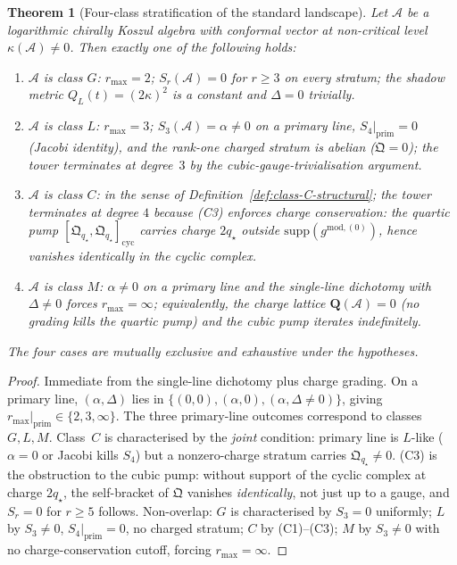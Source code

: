 \documentclass[11pt]{article}
\newtheorem{theorem}{Theorem}[section]
\theoremstyle{definition}
\theoremstyle{remark}
\newcommand{\cA}{\mathcal{A}}
\numberwithin{equation}{section}
\begin{document}
\begin{theorem}[Four-class stratification of the standard landscape]
\label{thm:four-class-stratification}
Let $\cA$ be a logarithmic chirally Koszul algebra with conformal
vector at non-critical level $\kappa(\cA) \neq 0$. Then exactly one
of the following holds:
\begin{enumerate}[nosep,label=(\roman*)]
\item $\cA$ is class $G$: $r_{\max} = 2$; $S_r(\cA) = 0$ for $r \geq 3$
on every stratum; the shadow metric $Q_L(t) = (2\kappa)^2$ is a
constant and $\Delta = 0$ trivially.
\item $\cA$ is class $L$: $r_{\max} = 3$; $S_3(\cA) = \alpha \neq 0$
on a primary line, $S_4|_{\mathrm{prim}} = 0$ (Jacobi identity),
and the rank-one charged stratum is abelian
($\mathfrak{Q} = 0$); the tower terminates at degree~$3$ by the
cubic-gauge-trivialisation argument.
\item $\cA$ is class $C$: in the sense of
Definition~\textup{\ref{def:class-C-structural}}; the tower
terminates at degree $4$ because (C3) enforces charge
conservation: the quartic pump $[\mathfrak{Q}_{q_\star},
\mathfrak{Q}_{q_\star}]_{\mathrm{cyc}}$ carries charge
$2q_\star$ outside $\mathrm{supp}(g^{\mathrm{mod},(0)})$, hence
vanishes identically in the cyclic complex.
\item $\cA$ is class $M$: $\alpha \neq 0$ on a primary line and the
single-line dichotomy with $\Delta \neq 0$ forces $r_{\max} =
\infty$; equivalently, the charge lattice $\mathbf{Q}(\cA) = 0$
(no grading kills the quartic pump) and the cubic pump iterates
indefinitely.
\end{enumerate}
The four cases are mutually exclusive and exhaustive under the
hypotheses.
\end{theorem}

\begin{proof}
Immediate from the single-line dichotomy plus charge grading.
On a primary line, $(\alpha, \Delta)$ lies in $\{(0,0), (\alpha,0),
(\alpha, \Delta \neq 0)\}$, giving $r_{\max}|_{\mathrm{prim}} \in \{2,
3, \infty\}$. The three primary-line outcomes correspond to classes
$G, L, M$. Class~$C$ is characterised by the \emph{joint} condition:
primary line is $L$-like ($\alpha = 0$ or Jacobi kills $S_4$) but a
nonzero-charge stratum carries $\mathfrak{Q}_{q_\star} \neq 0$. (C3)
is the obstruction to the cubic pump: without support of the cyclic
complex at charge $2q_\star$, the self-bracket of $\mathfrak{Q}$
vanishes \emph{identically}, not just up to a gauge, and $S_r = 0$
for $r \geq 5$ follows. Non-overlap: $G$ is characterised by $S_3 = 0$
uniformly; $L$ by $S_3 \neq 0$, $S_4|_{\mathrm{prim}} = 0$, no charged
stratum; $C$ by (C1)--(C3); $M$ by $S_3 \neq 0$ with no charge-conservation
cutoff, forcing $r_{\max} = \infty$.
\end{proof}
\end{document}
